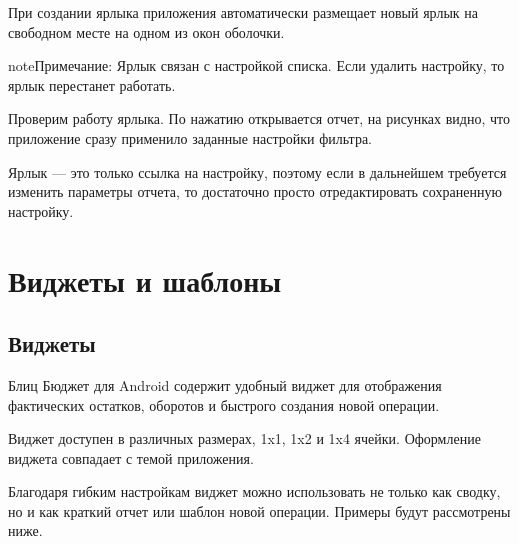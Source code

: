 \documentclass[a4paper,10pt,russian]{sphinxmanual}
\begin{document}
\noindent{}
\noindent{}

При создании ярлыка приложения автоматически размещает новый ярлык на свободном месте на одном из окон оболочки.

\begin{sphinxadmonition}{note}{Примечание:}
Ярлык связан с настройкой списка. Если удалить настройку, то ярлык перестанет работать.
\end{sphinxadmonition}

\noindent{}
\noindent{}
\noindent{}

Проверим работу ярлыка. По нажатию открывается отчет, на рисунках видно, что приложение сразу применило заданные
настройки фильтра.

Ярлык — это только ссылка на настройку, поэтому если в дальнейшем требуется изменить параметры отчета,
то достаточно просто отредактировать сохраненную настройку.


\chapter{Виджеты и шаблоны}
\label{\detokenize{widgets:chapter-widgets}}\label{\detokenize{widgets:id1}}\label{\detokenize{widgets::doc}}

\section{Виджеты}
\label{\detokenize{widgets:id2}}
Блиц Бюджет для Android содержит удобный виджет для отображения фактических остатков, оборотов и быстрого создания новой операции.


Виджет доступен в различных размерах, 1x1, 1x2 и 1x4 ячейки. Оформление виджета совпадает с темой приложения.

Благодаря гибким настройкам виджет можно использовать не только как сводку, но и как краткий отчет или шаблон
новой операции. Примеры будут рассмотрены ниже.
\end{document}

